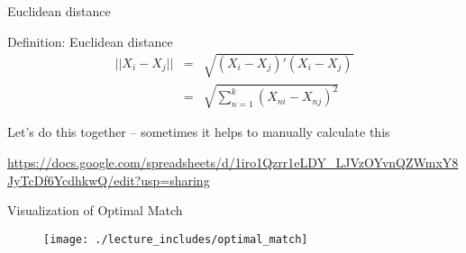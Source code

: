 \documentclass{beamer}
\newcommand*\colvec[1]{\begin{pmatrix}#1\end{pmatrix}}
\begin{document}
	

\begin{frame}{Euclidean distance}
	\begin{block}{Definition: Euclidean distance}
    \vspace*{-2.5mm}
    \begin{eqnarray*}
    ||X_i-X_j|| &=& \sqrt{ (X_i-X_j)'(X_i-X_j) } \\
    &=& \sqrt{ \sum_{n=1}^k (X_{ni} - X_{nj})^2 }
    \end{eqnarray*}
    \vspace*{-2.5mm}
	\end{block}
	
Let's do this together -- sometimes it helps to manually calculate this

\bigskip

\url{https://docs.google.com/spreadsheets/d/1iro1Qzrr1eLDY_LJVzOYvnQZWmxY8JyTcDf6YcdhkwQ/edit?usp=sharing}

	
\end{frame}

\begin{frame}{Visualization of Optimal Match}

\begin{figure}[!t]\centering
\texttt{[image: ./lecture\_includes/optimal\_match]}
\end{figure}

\end{frame}







\end{document}
